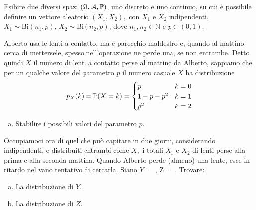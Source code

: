 \Esercizio{}

Esibire due diversi spazi $(\Omega ,\mathcal{A} ,\mathbb{P})$, uno discreto e uno continuo, su cui è possibile definire un vettore aleatorio $(X_{1} ,X_{2}) ,$ con $X_{1}$ e $X_{2}$ indipendenti, $X_{1} \sim \mathrm{Bi}(n_{1} ,p)$, $X_{2} \sim \mathrm{Bi}(n_{2} ,p)$, dove $n_{1} ,n_{2} \in \mathbb{N}$ e $p\in (0,1)$.

\Esercizio{}

Alberto usa le lenti a contatto, ma è parecchio maldestro e, quando al mattino cerca di mettersele, spesso nell'operazione ne perde una, se non entrambe. Detto quindi $X$ il numero di lenti a contatto perse al mattino da Alberto, sappiamo che per un qualche valore del parametro $p$ il numero casuale $X$ ha distribuzione
\begin{equation*}
	p_{X} (k)=\mathbb{P} (X=k)=
	\begin{cases}
		p & k=0\\
		1-p-p^{2} & k=1\\
		p^{2} & k=2
	\end{cases}
\end{equation*}
\begin{enumerate}[a)]
	\item Stabilire i possibili valori del parametro $p$.
\end{enumerate}
Occupiamoci ora di quel che può capitare in due giorni, considerando indipendenti, e distribuiti entrambi come $X,$ i totali $X_{1}$ e $X_{2}$ di lenti perse alla prima e alla seconda mattina. Quando Alberto perde (almeno) una lente, esce in ritardo nel vano tentativo di cercarla. Siano $Y=$ , $\mathrm{Z} =$ . Trovare:
\begin{enumerate}[a),resume]
	\item La distribuzione di $Y$.
	\item La distribuzione di $Z$.
\end{enumerate}

\ParteSoluzioni

